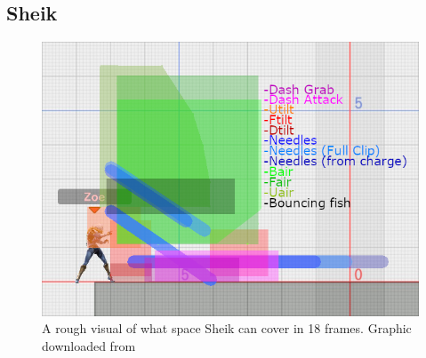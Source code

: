 \subsection{Sheik}

\begin{figure}[h]
    \centering
    \includegraphics[width=.4\textwidth]{images/threat-ranges/sheik}
    \caption{A rough visual of what space Sheik can cover in 18 frames. Graphic downloaded from\cite{ref:zovrah:threat-range:sheik}}
\end{figure}

